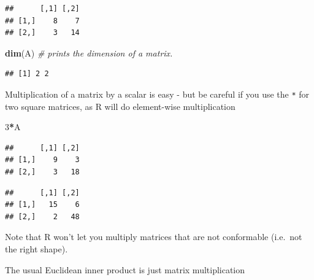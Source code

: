 \documentclass[]{book}
\newenvironment{Shaded}{\begin{snugshade}}{\end{snugshade}}
\newcommand{\CommentTok}[1]{\textcolor[rgb]{0.56,0.35,0.01}{\textit{#1}}}
\newcommand{\DecValTok}[1]{\textcolor[rgb]{0.00,0.00,0.81}{#1}}
\newcommand{\KeywordTok}[1]{\textcolor[rgb]{0.13,0.29,0.53}{\textbf{#1}}}
\newcommand{\NormalTok}[1]{#1}
\newcommand{\OperatorTok}[1]{\textcolor[rgb]{0.81,0.36,0.00}{\textbf{#1}}}
\newcommand{\StringTok}[1]{\textcolor[rgb]{0.31,0.60,0.02}{#1}}
\theoremstyle{definition}
\theoremstyle{definition}
\theoremstyle{definition}
\theoremstyle{remark}
\begin{document}
\begin{verbatim}
##      [,1] [,2]
## [1,]    8    7
## [2,]    3   14
\end{verbatim}

\begin{Shaded}
\begin{Highlighting}[]
\KeywordTok{dim}\NormalTok{(A)                           }\CommentTok{# prints the dimension of a matrix.}
\end{Highlighting}
\end{Shaded}

\begin{verbatim}
## [1] 2 2
\end{verbatim}

Multiplication of a matrix by a scalar is easy - but be careful if you use the \texttt{*} for two square matrices, as R will do element-wise multiplication

\begin{Shaded}
\begin{Highlighting}[]
\DecValTok{3}\OperatorTok{*}\NormalTok{A}
\end{Highlighting}
\end{Shaded}

\begin{verbatim}
##      [,1] [,2]
## [1,]    9    3
## [2,]    3   18
\end{verbatim}

\begin{Shaded}
\end{Shaded}

\begin{verbatim}
##      [,1] [,2]
## [1,]   15    6
## [2,]    2   48
\end{verbatim}

Note that R won't let you multiply matrices that are not conformable (i.e.~not the right shape).

The usual Euclidean inner product is just matrix multiplication

\begin{Shaded}
\end{Shaded}
\end{document}
